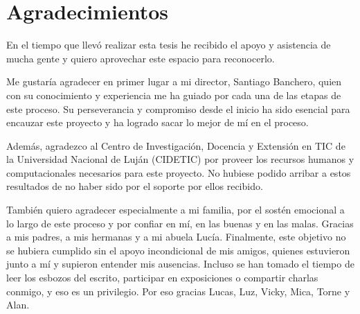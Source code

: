 \chapter*{Agradecimientos}

\noindent En el tiempo que llevó realizar esta tesis he recibido el apoyo y
asistencia de mucha gente y quiero aprovechar este espacio para reconocerlo.

Me gustaría agradecer en primer lugar a mi director, Santiago Banchero, quien
con su conocimiento y experiencia me ha guiado por cada una de las etapas de este
proceso. Su perseverancia y compromiso desde el inicio ha sido esencial para
encauzar este proyecto y ha logrado sacar lo mejor de mí en el proceso.

Además, agradezco al Centro de Investigación, Docencia y Extensión en TIC de la
Universidad Nacional de Luján (CIDETIC) por proveer los recursos humanos y
computacionales necesarios para este proyecto. No hubiese podido arribar a estos
resultados de no haber sido por el soporte por ellos recibido.

También quiero agradecer especialmente a mi familia, por el sostén emocional a
lo largo de este proceso y por confiar en mí, en las buenas y en las malas.
Gracias a mis padres, a mis hermanas y a mi abuela Lucía.  Finalmente, este
objetivo no se hubiera cumplido sin el apoyo incondicional de mis amigos,
quienes estuvieron junto a mí y supieron entender mis ausencias. Incluso se han
tomado el tiempo de leer los esbozos del escrito, participar en exposiciones o
compartir charlas conmigo, y eso es un privilegio. Por eso gracias Lucas, Luz,
Vicky, Mica, Torne y Alan.
